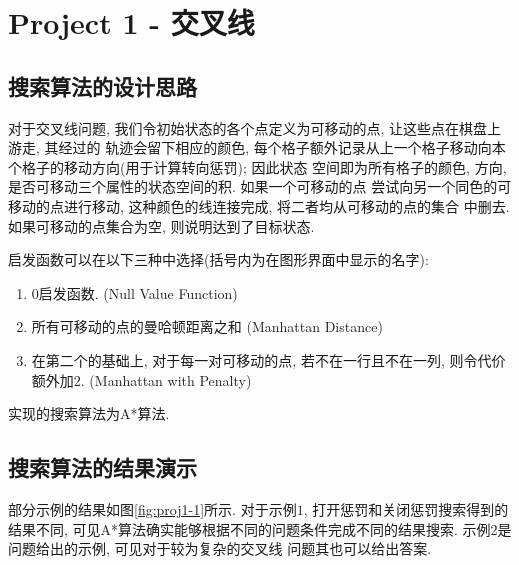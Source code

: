 \section{Project 1 - 交叉线}

\subsection{搜索算法的设计思路}

对于交叉线问题, 我们令初始状态的各个点定义为可移动的点, 让这些点在棋盘上游走, 其经过的
轨迹会留下相应的颜色, 每个格子额外记录从上一个格子移动向本个格子的移动方向(用于计算转向惩罚); 因此状态
空间即为所有格子的颜色, 方向, 是否可移动三个属性的状态空间的积. 如果一个可移动的点
尝试向另一个同色的可移动的点进行移动, 这种颜色的线连接完成, 将二者均从可移动的点的集合
中删去. 如果可移动的点集合为空, 则说明达到了目标状态.

启发函数可以在以下三种中选择(括号内为在图形界面中显示的名字):

\begin{enumerate}
    \item $0$启发函数. (Null Value Function)
    \item 所有可移动的点的曼哈顿距离之和 (Manhattan Distance)
    \item 在第二个的基础上, 对于每一对可移动的点, 若不在一行且不在一列, 则令代价额外加$2$. (Manhattan with Penalty)
\end{enumerate}

实现的搜索算法为A*算法.

\subsection{搜索算法的结果演示}

部分示例的结果如图\ref{fig:proj1-1}所示. 对于示例$1$, 打开惩罚和关闭惩罚搜索得到的结果不同,
可见A*算法确实能够根据不同的问题条件完成不同的结果搜索. 示例2是问题给出的示例, 可见对于较为复杂的交叉线
问题其也可以给出答案.

